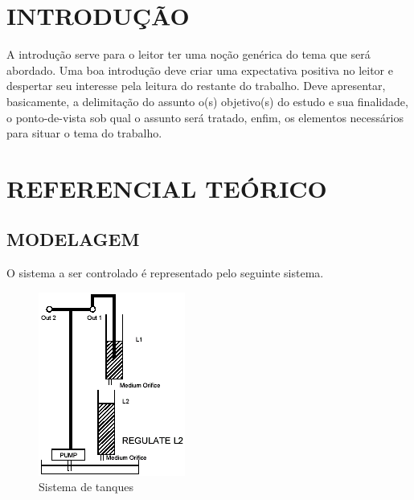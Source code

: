 \documentclass[a4paper,12pt]{article}
\begin{document}
\newpage


\thispagestyle{main}

\section{INTRODUÇÃO}

\begin{flushleft}
\hspace{4ex}A introdução serve para o leitor ter uma noção genérica do tema que será
abordado. Uma boa introdução deve criar uma expectativa positiva no leitor e despertar
seu interesse pela leitura do restante do trabalho. Deve apresentar, basicamente, a
delimitação do assunto o(s) objetivo(s) do estudo e sua finalidade, o ponto-de-vista sob
qual o assunto será tratado, enfim, os elementos necessários para situar o tema do
trabalho.
\end{flushleft}

\newpage


\thispagestyle{main}

\section{REFERENCIAL TEÓRICO}

\subsection{MODELAGEM}
\hspace{4ex}O sistema a ser controlado é representado pelo seguinte sistema.
\begin{figure}[h]
\includegraphics[scale=1]{tanques.png}
\caption{Sistema de tanques}
\label{fig:tanques}
\end{figure}
\end{document}
